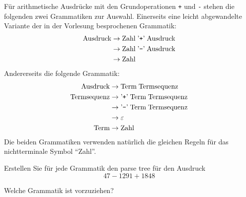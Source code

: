 Für arithmetische Ausdrücke mit den Grundoperationen
{\tt +} und {\tt -} stehen die folgenden zwei Grammatiken
zur Auswahl. Einerseits eine leicht abgewandelte Variante
der in der Vorlesung besprochenen Grammatik:
\begin{align*}
\text{Ausdruck}&\rightarrow \text{Zahl}\;\text{'{\tt +}'}\;\text{Ausdruck} \\
               &\rightarrow \text{Zahl}\;\text{'{\tt -}'}\;\text{Ausdruck} \\
               &\rightarrow \text{Zahl}
\end{align*}
Andererseits die folgende Grammatik:
\begin{align*}
\text{Ausdruck}&\rightarrow \text{Term}\;\text{Termsequenz}\\
\text{Termsequenz}&\rightarrow \text{'{\tt +}'}\; \text{Term}\; \text{Termsequenz}\\
                  &\rightarrow \text{'{\tt -}'}\; \text{Term}\; \text{Termsequenz}\\
                  &\rightarrow \varepsilon\\
 \text{Term}&\rightarrow \text{Zahl}
\end{align*}
Die beiden Grammatiken verwenden natürlich die gleichen Regeln
für das nichtterminale Symbol ``Zahl''.
\begin{teilaufgaben}
\item Erstellen Sie für jede Grammatik den parse tree für den Ausdruck
\[
47-1291+1848
\]
\item Welche Grammatik ist vorzuziehen?
\end{teilaufgaben}

